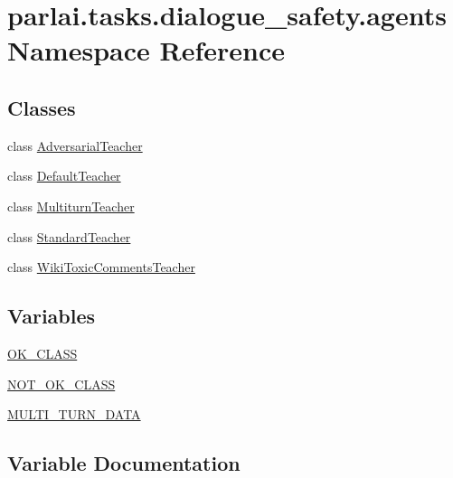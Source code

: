 \hypertarget{namespaceparlai_1_1tasks_1_1dialogue__safety_1_1agents}{}\section{parlai.\+tasks.\+dialogue\+\_\+safety.\+agents Namespace Reference}
\label{namespaceparlai_1_1tasks_1_1dialogue__safety_1_1agents}
\subsection*{Classes}
\begin{DoxyCompactItemize}
\item 
class \hyperlink{classparlai_1_1tasks_1_1dialogue__safety_1_1agents_1_1AdversarialTeacher}{Adversarial\+Teacher}
\item 
class \hyperlink{classparlai_1_1tasks_1_1dialogue__safety_1_1agents_1_1DefaultTeacher}{Default\+Teacher}
\item 
class \hyperlink{classparlai_1_1tasks_1_1dialogue__safety_1_1agents_1_1MultiturnTeacher}{Multiturn\+Teacher}
\item 
class \hyperlink{classparlai_1_1tasks_1_1dialogue__safety_1_1agents_1_1StandardTeacher}{Standard\+Teacher}
\item 
class \hyperlink{classparlai_1_1tasks_1_1dialogue__safety_1_1agents_1_1WikiToxicCommentsTeacher}{Wiki\+Toxic\+Comments\+Teacher}
\end{DoxyCompactItemize}
\subsection*{Variables}
\begin{DoxyCompactItemize}
\item 
\hyperlink{namespaceparlai_1_1tasks_1_1dialogue__safety_1_1agents_a1c2fade8ec3203a370b31f882100f7d3}{O\+K\+\_\+\+C\+L\+A\+SS}
\item 
\hyperlink{namespaceparlai_1_1tasks_1_1dialogue__safety_1_1agents_addc8d93d05a2dde65bb1813774be1dc8}{N\+O\+T\+\_\+\+O\+K\+\_\+\+C\+L\+A\+SS}
\item 
\hyperlink{namespaceparlai_1_1tasks_1_1dialogue__safety_1_1agents_a0700094d5f2c56802a9dde82d6de0a0e}{M\+U\+L\+T\+I\+\_\+\+T\+U\+R\+N\+\_\+\+D\+A\+TA}
\end{DoxyCompactItemize}


\subsection{Variable Documentation}
\mbox{\label{namespaceparlai_1_1tasks_1_1dialogue__safety_1_1agents_a0700094d5f2c56802a9dde82d6de0a0e}} 
